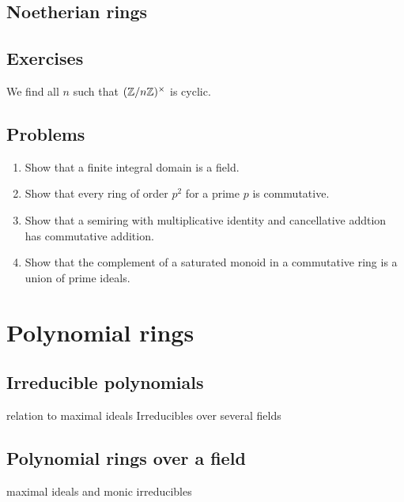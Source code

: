\documentclass{../../large}
\begin{document}
\section{Noetherian rings}

\section*{Exercises}
\begin{prb}
We find all $n$ such that $(\mathbb{Z}/n\mathbb{Z})^\times$ is cyclic.
\end{prb}

\section*{Problems}
\begin{enumerate}
\item Show that a finite integral domain is a field.
\item Show that every ring of order $p^2$ for a prime $p$ is commutative.
\item Show that a semiring with multiplicative identity and cancellative addtion has commutative addition.
\item Show that the complement of a saturated monoid in a commutative ring is a union of prime ideals.
\end{enumerate}





\chapter{Polynomial rings}
\section{Irreducible polynomials}
relation to maximal ideals
Irreducibles over several fields
\begin{prb}
\end{prb}
\begin{prb}
\end{prb}

\section{Polynomial rings over a field}
\begin{prb}
\end{prb}
\begin{prb}
\end{prb}
\begin{prb}
\end{prb}

maximal ideals and monic irreducibles
\end{document}
